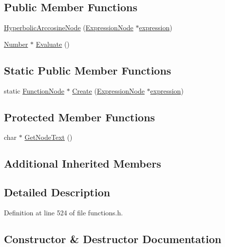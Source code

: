 \subsection*{Public Member Functions}
\begin{DoxyCompactItemize}
\item 
\hyperlink{classHyperbolicArccosineNode_a39dd6c0bfe96f490eb25b5e695b7042f}{Hyperbolic\+Arccosine\+Node} (\hyperlink{classExpressionNode}{Expression\+Node} $\ast$\hyperlink{classFunctionNode_ad7577b179a1937aaf8a0058bb5b546dc}{expression})
\item 
\hyperlink{structNumber}{Number} $\ast$ \hyperlink{classHyperbolicArccosineNode_af904405c7245b54f300d47c71ded279e}{Evaluate} ()
\end{DoxyCompactItemize}
\subsection*{Static Public Member Functions}
\begin{DoxyCompactItemize}
\item 
static \hyperlink{classFunctionNode}{Function\+Node} $\ast$ \hyperlink{classHyperbolicArccosineNode_a0af1b04547b02be2ab89ed7368e82f59}{Create} (\hyperlink{classExpressionNode}{Expression\+Node} $\ast$\hyperlink{classFunctionNode_ad7577b179a1937aaf8a0058bb5b546dc}{expression})
\end{DoxyCompactItemize}
\subsection*{Protected Member Functions}
\begin{DoxyCompactItemize}
\item 
char $\ast$ \hyperlink{classHyperbolicArccosineNode_ac2811646745c654182280a06489c752c}{Get\+Node\+Text} ()
\end{DoxyCompactItemize}
\subsection*{Additional Inherited Members}


\subsection{Detailed Description}


Definition at line 524 of file functions.\+h.



\subsection{Constructor \& Destructor Documentation}
